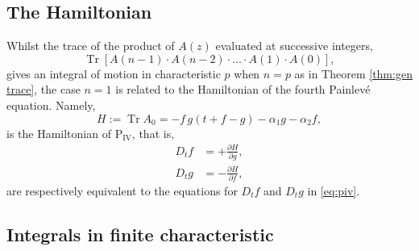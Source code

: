 \documentclass[a4paper,reqno]{amsart}
\numberwithin{equation}{section}
\numberwithin{figure}{section}
\theoremstyle{remark}
\newcommand\Pfour{\textrm{P}_{\textrm{IV}}}
\begin{document}
\subsection{The Hamiltonian}Whilst the trace of the product of $A(z)$ evaluated at successive integers,
$$\operatorname{Tr}[A(n-1)\cdot A(n-2)\cdot\ldots\cdot A(1)\cdot A(0)],$$
gives an integral of motion in characteristic $p$ when $n=p$ as in Theorem \ref{thm:gen trace}, the case $n=1$ is related to the Hamiltonian of the fourth Painlev\'e equation. Namely,
\begin{equation*}
    H:=\operatorname{Tr}A_0=-f\,g(t+f-g)-\alpha_1g-\alpha_2f,
\end{equation*}
is the Hamiltonian of $\Pfour$, that is,
\begin{align*}
    D_tf&=+\frac{\partial H}{\partial g},\\
    D_tg&=-\frac{\partial H}{\partial f},
\end{align*}
are respectively equivalent to the equations for $D_tf$ and $D_tg$ in \eqref{eq:piv}.








\subsection{Integrals in finite characteristic}
\end{document}
